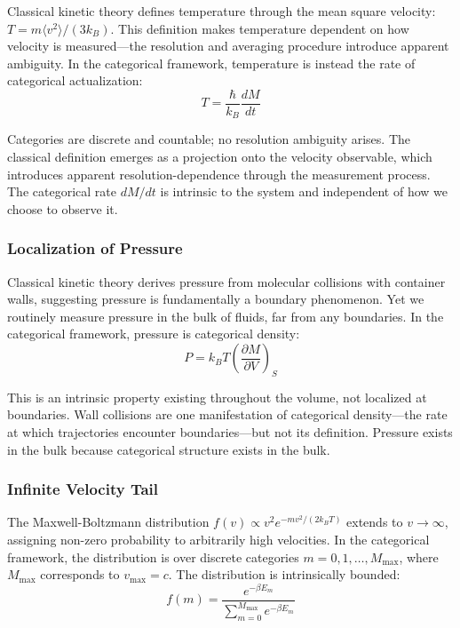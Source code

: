 \documentclass[twocolumn,10pt]{article}
\theoremstyle{plain}
\theoremstyle{definition}
\theoremstyle{remark}
\begin{document}
Classical kinetic theory defines temperature through the mean square velocity: $T = m\langle v^2\rangle/(3k_B)$. This definition makes temperature dependent on how velocity is measured---the resolution and averaging procedure introduce apparent ambiguity. In the categorical framework, temperature is instead the rate of categorical actualization:
\begin{equation}
T = \frac{\hbar}{k_B}\frac{dM}{dt}
\end{equation}

Categories are discrete and countable; no resolution ambiguity arises. The classical definition emerges as a projection onto the velocity observable, which introduces apparent resolution-dependence through the measurement process. The categorical rate $dM/dt$ is intrinsic to the system and independent of how we choose to observe it.

\subsubsection{Localization of Pressure}

Classical kinetic theory derives pressure from molecular collisions with container walls, suggesting pressure is fundamentally a boundary phenomenon. Yet we routinely measure pressure in the bulk of fluids, far from any boundaries. In the categorical framework, pressure is categorical density:
\begin{equation}
P = k_B T \left(\frac{\partial M}{\partial V}\right)_S
\end{equation}

This is an intrinsic property existing throughout the volume, not localized at boundaries. Wall collisions are one manifestation of categorical density---the rate at which trajectories encounter boundaries---but not its definition. Pressure exists in the bulk because categorical structure exists in the bulk.

\subsubsection{Infinite Velocity Tail}

The Maxwell-Boltzmann distribution $f(v) \propto v^2 e^{-mv^2/(2k_BT)}$ extends to $v \to \infty$, assigning non-zero probability to arbitrarily high velocities. In the categorical framework, the distribution is over discrete categories $m = 0, 1, \ldots, M_{\max}$, where $M_{\max}$ corresponds to $v_{\max} = c$. The distribution is intrinsically bounded:
\begin{equation}
f(m) = \frac{e^{-\beta E_m}}{\sum_{m=0}^{M_{\max}} e^{-\beta E_m}}
\end{equation}
\end{document}
